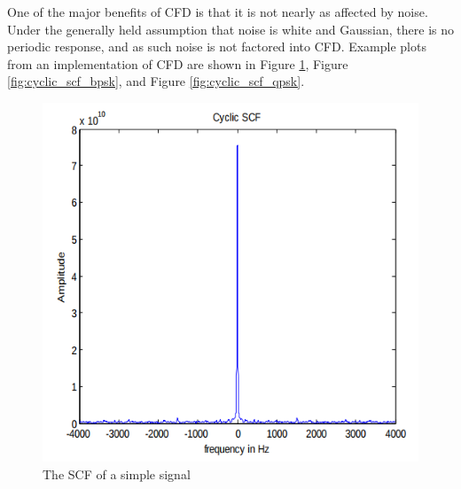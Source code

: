 One of the major benefits of CFD is that it is not nearly as affected by noise. Under the generally held assumption that noise is white and Gaussian, there is no periodic response, and as such noise is not factored into CFD. Example plots from an implementation of CFD are shown in Figure \ref{fig:cyclic_scf}, Figure \ref{fig:cyclic_scf_bpsk}, and Figure \ref{fig:cyclic_scf_qpsk}. \par
\begin{figure}[ht!]
\centering
  \includegraphics[scale=0.4]{img/cyclic_scf.png}
\caption{The SCF of a simple signal}
\label{fig:cyclic_scf}

\end{figure}
